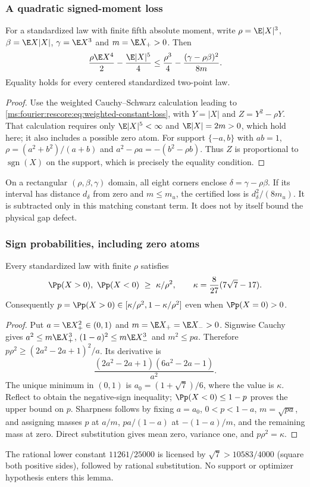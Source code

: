 \subsubsection{A quadratic signed-moment loss}
\begin{lemma}\label{ms:finite:signed-loss}
For a standardized law with finite fifth absolute moment, write
$\rho=\E|X|^3$, $\beta=\E X|X|$, $\gamma=\E X^3$ and
$m=\E X_+>0$. Then
\[
 \frac{\rho\E X^4}{2}-\frac{\E|X|^5}{4}
 \le\frac{\rho^3}{4}-\frac{(\gamma-\rho\beta)^2}{8m}.
\]
Equality holds for every centered standardized two-point law.
\end{lemma}
\begin{proof}
Use the weighted Cauchy--Schwarz calculation leading to
\eqref{ms:fourier:rescore:eq:weighted-constant-loss}, with
$Y=|X|$ and $Z=Y^2-\rho Y$. That calculation requires only
$\E|X|^5<\infty$ and $\E|X|=2m>0$, which hold here; it also
includes a possible zero atom.
For support $\{-a,b\}$ with $ab=1$,
$\rho=(a^2+b^2)/(a+b)$ and $a^2-\rho a=-(b^2-\rho b)$.
Thus $Z$ is proportional to $\operatorname{sgn}(X)$ on the support,
which is precisely the equality condition.
\end{proof}
On a rectangular $(\rho,\beta,\gamma)$ domain, all eight corners
enclose $\delta=\gamma-\rho\beta$. If its interval has distance
$d_\delta$ from zero and $m\le m_u$, the certified loss is
$d_\delta^2/(8m_u)$. It is subtracted only in this matching constant
term. It does not by itself bound the physical gap defect.

\subsubsection{Sign probabilities, including zero atoms}
\begin{lemma}\label{ms:finite:sign-probability}
Every standardized law with finite $\rho$ satisfies
\[
 \Pp(X>0),\ \Pp(X<0)\ \ge\ \kappa/\rho^2,
 \qquad \kappa=\frac8{27}(7\sqrt7-17).
\]
Consequently $p=\Pp(X>0)\in[\kappa/\rho^2,1-\kappa/\rho^2]$
even when $\Pp(X=0)>0$.
\end{lemma}
\begin{proof}
Put $a=\E X_+^2\in(0,1)$ and $m=\E X_+=\E X_->0$.
Signwise Cauchy gives
$a^2\le m\E X_+^3$, $(1-a)^2\le m\E X_-^3$ and $m^2\le pa$.
Therefore $p\rho^2\ge(2a^2-2a+1)^2/a$. Its derivative is
\[
 \frac{(2a^2-2a+1)(6a^2-2a-1)}{a^2}.
\]
The unique minimum in $(0,1)$ is $a_0=(1+\sqrt7)/6$, where the
value is $\kappa$. Reflect to obtain the negative-sign inequality;
$\Pp(X<0)\le1-p$ proves the upper bound on $p$.
Sharpness follows by fixing $a=a_0$, $0<p<1-a$, $m=\sqrt{pa}$,
and assigning masses $p$ at $a/m$, $pa/(1-a)$ at $-(1-a)/m$,
and the remaining mass at zero. Direct substitution gives mean zero,
variance one, and $p\rho^2=\kappa$.
\end{proof}
The rational lower constant $11261/25000$ is licensed by
$\sqrt7>10583/4000$ (square both positive sides), followed by
rational substitution. No support or optimizer hypothesis enters this lemma.

